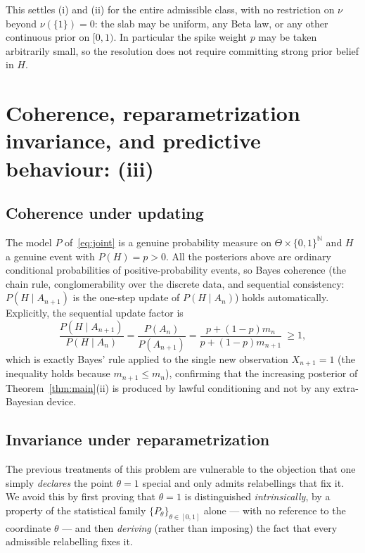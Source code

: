 \documentclass{amsart}
\theoremstyle{definition}
\newcommand{\N}{\mathbb{N}}
\begin{document}
This settles (i) and (ii) for the entire admissible class, with no restriction
on $\nu$ beyond $\nu(\{1\})=0$: the slab may be uniform, any Beta law, or any
other continuous prior on $[0,1)$. In particular the spike weight $p$ may be
taken arbitrarily small, so the resolution does not require committing strong
prior belief in $H$.

\section{Coherence, reparametrization invariance, and predictive behaviour: (iii)}
\label{sec:coherence}

\subsection{Coherence under updating}
The model $P$ of~\eqref{eq:joint} is a genuine probability measure on
$\Theta\times\{0,1\}^\N$ and $H$ a genuine event with $P(H)=p>0$. All the
posteriors above are ordinary conditional probabilities of positive-probability
events, so Bayes coherence (the chain rule, conglomerability over the discrete
data, and sequential consistency: $P(H\mid A_{n+1})$ is the one-step update of
$P(H\mid A_n)$) holds automatically. Explicitly, the sequential update factor is
\begin{equation}\label{eq:sequential}
  \frac{P(H\mid A_{n+1})}{P(H\mid A_n)}
  =\frac{P(A_n)}{P(A_{n+1})}
  =\frac{p+(1-p)m_n}{p+(1-p)m_{n+1}}\ \ge 1,
\end{equation}
which is exactly Bayes' rule applied to the single new observation
$X_{n+1}=1$ (the inequality holds because $m_{n+1}\le m_n$), confirming that the
increasing posterior of Theorem~\ref{thm:main}(ii) is produced by lawful
conditioning and not by any extra-Bayesian device.

\subsection{Invariance under reparametrization}
The previous treatments of this problem are vulnerable to the objection that one
simply \emph{declares} the point $\theta=1$ special and only admits relabellings
that fix it. We avoid this by first proving that $\theta=1$ is distinguished
\emph{intrinsically}, by a property of the statistical family
$\{P_\theta\}_{\theta\in[0,1]}$ alone --- with no reference to the coordinate
$\theta$ --- and then \emph{deriving} (rather than imposing) the fact that every
admissible relabelling fixes it.
\end{document}
